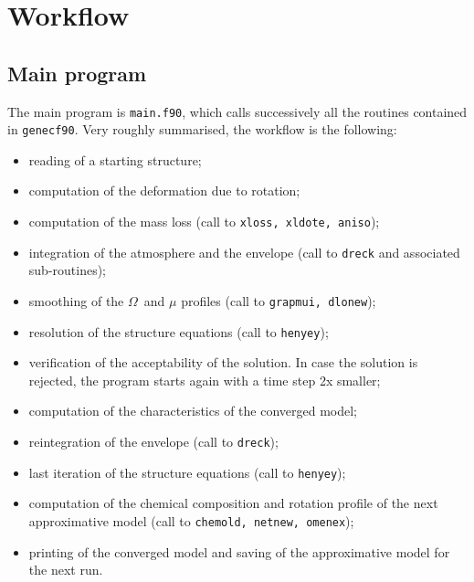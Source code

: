 \documentclass[11pt]{article}
\def\om{\ensuremath{\Omega}}
\def\itembb{\item[\ \ \ \textbullet]}
\begin{document}
\section{Workflow}
\subsection{Main program}
The main program is \texttt{main.f90}, which calls successively all the routines contained in {\tt genecf90}. Very roughly summarised, the workflow is the following:
\begin{itemize}
 \itembb reading of a starting structure;
 \itembb computation of the deformation due to rotation;
 \itembb computation of the mass loss (call to \texttt{xloss, xldote, aniso});
 \itembb integration  of the atmosphere and the envelope (call to \texttt{dreck} and associated sub-routines);
 \itembb smoothing of the \om\ and $\mu$ profiles (call to \texttt{grapmui, dlonew});
 \itembb resolution of the structure equations (call to \texttt{henyey});
 \itembb verification of the acceptability of the solution. In case the solution is rejected, the program starts again with a time step 2x smaller;
 \itembb computation of the characteristics of the converged model;
 \itembb reintegration of the envelope (call to \texttt{dreck});
 \itembb last iteration of the structure equations (call to \texttt{henyey});
 \itembb computation of the chemical composition and rotation profile of the next approximative model (call to \texttt{chemold, netnew, omenex});
 \itembb printing of the converged model and saving of the approximative model for the next run.
\end{itemize}

\end{document}
